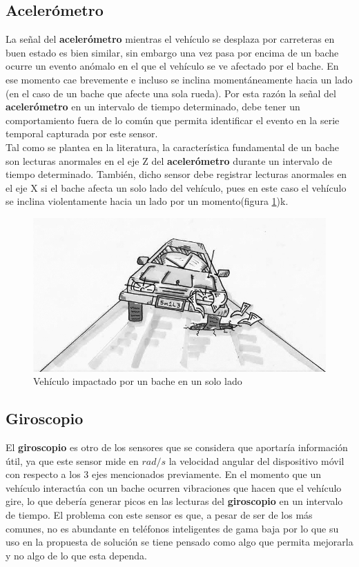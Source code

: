 	\subsection{Acelerómetro}
		La señal del \textbf{acelerómetro} mientras el vehículo se desplaza por carreteras en buen estado es bien similar,
		sin embargo una vez pasa por encima de un bache ocurre un evento anómalo en el que el vehículo se ve afectado
		por el bache. En ese momento cae brevemente e incluso se inclina momentáneamente hacia un lado (en el caso de un bache
		que afecte una sola rueda). Por esta razón la señal del \textbf{acelerómetro} en un intervalo de tiempo determinado, debe tener
		un comportamiento fuera de lo común que permita identificar el evento en la serie temporal capturada por este sensor.\\
		\indent Tal como se plantea en la literatura, la característica fundamental de un bache son lecturas anormales en el eje
		Z del \textbf{acelerómetro} durante un intervalo de tiempo determinado. También, dicho sensor debe registrar lecturas
		anormales en el eje X si el bache afecta un solo lado del vehículo, pues en este caso el vehículo se inclina violentamente
		hacia un lado por un momento(figura \ref{fig:4})k.\\

	\begin{figure}[htb]
		\centering
		\includegraphics[scale = 0.5]{Graphics/one_side_pothole_vehicle.jpg}
		\caption{Vehículo impactado por un bache en un solo lado}
		\label{fig:4}
	\end{figure}

	\subsection{Giroscopio}
		El \textbf{giroscopio} es otro de los sensores que se considera que aportaría información útil, ya que este sensor 
		mide en $rad/s$ la velocidad angular del dispositivo móvil con respecto a los 3 ejes mencionados previamente. 
		En el momento que un vehículo interactúa con un bache ocurren vibraciones que hacen que el vehículo gire, lo que
		debería generar picos en las lecturas del \textbf{giroscopio} en un intervalo de tiempo. El problema con este sensor es 
		que, a pesar de ser de los más comunes, no es abundante en teléfonos inteligentes de gama baja por lo que 
		su uso en la propuesta de solución se tiene pensado como algo que permita mejorarla y no algo de lo que esta
		dependa.\\

